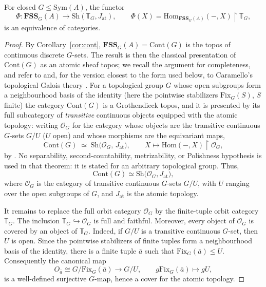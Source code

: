 \documentclass{lmcs}
\newcommand{\Sym}{\mathrm{Sym}}
\newcommand{\Fix}{\mathrm{Fix}}
\newcommand{\FSS}{\mathbf{FSS}}
\newcommand{\Hom}{\mathrm{Hom}}
\begin{document}
\begin{thm}\label{thm:site}
For closed $G\leq\Sym(A)$, the functor
\[
\Phi:\FSS_G(A)\longrightarrow
\mathrm{Sh}(\mathbb T_G,J_{\mathrm{at}}),\qquad
\Phi(X)=\Hom_{\FSS_G(A)}(-,X)\restriction\mathbb T_G,
\]
is an equivalence of categories.
\end{thm}

\begin{proof}
By Corollary~\ref{cor:cont}, $\FSS_G(A)=\mathrm{Cont}(G)$ is the topos of continuous discrete $G$-sets. The result is then the classical presentation of $\mathrm{Cont}(G)$ as an atomic sheaf topos; we recall the argument for completeness, and refer to \cite[III.9]{MacLaneMoerdijk} and, for the version closest to the form used below, to Caramello's topological Galois theory \cite[Prop.~2.3 and Cor.~3.7]{Caramello16}. For a topological group $G$ whose open subgroups form a neighbourhood basis of the identity (here the pointwise stabilizers $\Fix_G(S)$, $S$ finite) the
category $\mathrm{Cont}(G)$ is a Grothendieck topos, and it is presented by its full subcategory of \emph{transitive} continuous objects equipped with the atomic topology: writing $\mathcal O_G$ for the category whose objects are the transitive continuous $G$-sets $G/U$ ($U$ open) and whose morphisms are the equivariant maps,
\[
\mathrm{Cont}(G)\;\simeq\;
\mathrm{Sh}\bigl(\mathcal O_G,\,J_{\mathrm{at}}\bigr),
\qquad X\longmapsto\Hom(-,X)\restriction\mathcal O_G,
\]
by \cite[III.9, Thm.~1]{MacLaneMoerdijk}. No separability, second-countability, metrizability, or Polishness hypothesis is used in that theorem: it is stated for an arbitrary topological group. Thus,
\[
   \mathrm{Cont}(G)
   \simeq
   \mathrm{Sh}\bigl(\mathcal O_G,J_{\mathrm{at}}\bigr),
\]
where $\mathcal O_G$ is the category of transitive continuous $G$-sets $G/U$, with $U$ ranging over the open subgroups of $G$, and $J_{\mathrm{at}}$ is the atomic topology.

It remains to replace the full orbit category $\mathcal O_G$ by the finite-tuple orbit category $\mathbb T_G$. The inclusion
$\mathbb T_G\hookrightarrow\mathcal O_G$ is full and faithful. Moreover, every object of $\mathcal O_G$ is covered by an object of $\mathbb T_G$.  Indeed, if $G/U$ is a transitive continuous $G$-set, then $U$ is open. Since the pointwise stabilizers of finite tuples form a neighbourhood basis of the identity, there is a finite tuple $\bar a$ such that $\Fix_G(\bar a)\leq U$. Consequently the canonical map
\[
   O_{\bar a}
   \cong G/\Fix_G(\bar a)
   \longrightarrow G/U,
   \qquad
   g\Fix_G(\bar a)\longmapsto gU,
\]
is a well-defined surjective $G$-map, hence a cover for the atomic topology.


\end{proof}
\end{document}
